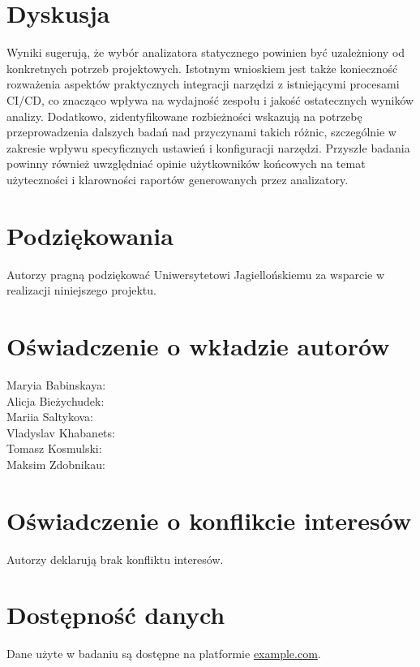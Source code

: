 \documentclass[a4paper,12pt]{article}
\begin{document}
\section{Dyskusja}
Wyniki sugerują, że wybór analizatora statycznego powinien być uzależniony od konkretnych potrzeb projektowych. Istotnym wnioskiem jest także konieczność rozważenia aspektów praktycznych integracji narzędzi z istniejącymi procesami CI/CD, co znacząco wpływa na wydajność zespołu i jakość ostatecznych wyników analizy. Dodatkowo, zidentyfikowane rozbieżności wskazują na potrzebę przeprowadzenia dalszych badań nad przyczynami takich różnic, szczególnie w zakresie wpływu specyficznych ustawień i konfiguracji narzędzi. Przyszłe badania powinny również uwzględniać opinie użytkowników końcowych na temat użyteczności i klarowności raportów generowanych przez analizatory.

\section*{Podziękowania}
Autorzy pragną podziękować Uniwersytetowi Jagiellońskiemu za wsparcie w realizacji niniejszego projektu.

\section*{Oświadczenie o wkładzie autorów}
Maryia Babinskaya: \\
Alicja Bieżychudek: \\
Mariia Saltykova: \\
Vladyslav Khabanets: \\
Tomasz Kosmulski: \\
Maksim Zdobnikau: \\

\section*{Oświadczenie o konflikcie interesów}
Autorzy deklarują brak konfliktu interesów.

\section*{Dostępność danych}
Dane użyte w badaniu są dostępne na platformie \href{https://example.com}{example.com}.



\end{document}
